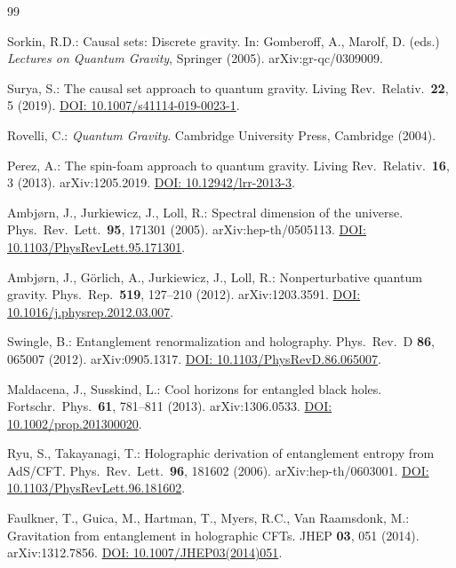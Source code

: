﻿\documentclass[12pt,a4paper]{article}
\theoremstyle{definition}
\begin{document}
\begin{thebibliography}{99}

Sorkin, R.D.: Causal sets: Discrete gravity. In: Gomberoff, A., Marolf, D. (eds.) \textit{Lectures on Quantum Gravity}, Springer (2005). arXiv:gr-qc/0309009.

Surya, S.: The causal set approach to quantum gravity. Living Rev.\ Relativ.\ \textbf{22}, 5 (2019). \href{https://doi.org/10.1007/s41114-019-0023-1}{DOI: 10.1007/s41114-019-0023-1}.

Rovelli, C.: \textit{Quantum Gravity}. Cambridge University Press, Cambridge (2004).

Perez, A.: The spin-foam approach to quantum gravity. Living Rev.\ Relativ.\ \textbf{16}, 3 (2013). arXiv:1205.2019. \href{https://doi.org/10.12942/lrr-2013-3}{DOI: 10.12942/lrr-2013-3}.

Ambj{\o}rn, J., Jurkiewicz, J., Loll, R.: Spectral dimension of the universe. Phys.\ Rev.\ Lett.\ \textbf{95}, 171301 (2005). arXiv:hep-th/0505113. \href{https://doi.org/10.1103/PhysRevLett.95.171301}{DOI: 10.1103/PhysRevLett.95.171301}.

Ambj{\o}rn, J., G\"orlich, A., Jurkiewicz, J., Loll, R.: Nonperturbative quantum gravity. Phys.\ Rep.\ \textbf{519}, 127--210 (2012). arXiv:1203.3591. \href{https://doi.org/10.1016/j.physrep.2012.03.007}{DOI: 10.1016/j.physrep.2012.03.007}.

Swingle, B.: Entanglement renormalization and holography. Phys.\ Rev.\ D \textbf{86}, 065007 (2012). arXiv:0905.1317. \href{https://doi.org/10.1103/PhysRevD.86.065007}{DOI: 10.1103/PhysRevD.86.065007}.

Maldacena, J., Susskind, L.: Cool horizons for entangled black holes. Fortschr.\ Phys.\ \textbf{61}, 781--811 (2013). arXiv:1306.0533. \href{https://doi.org/10.1002/prop.201300020}{DOI: 10.1002/prop.201300020}.

Ryu, S., Takayanagi, T.: Holographic derivation of entanglement entropy from AdS/CFT. Phys.\ Rev.\ Lett.\ \textbf{96}, 181602 (2006). arXiv:hep-th/0603001. \href{https://doi.org/10.1103/PhysRevLett.96.181602}{DOI: 10.1103/PhysRevLett.96.181602}.

Faulkner, T., Guica, M., Hartman, T., Myers, R.C., Van Raamsdonk, M.: Gravitation from entanglement in holographic CFTs. JHEP \textbf{03}, 051 (2014). arXiv:1312.7856. \href{https://doi.org/10.1007/JHEP03(2014)051}{DOI: 10.1007/JHEP03(2014)051}.


\end{thebibliography}
\end{document}

